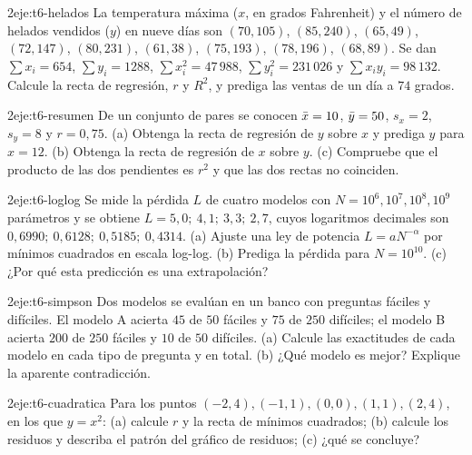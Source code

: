 \begin{ejercicio}{2}{eje:t6-helados}
La temperatura máxima ($x$, en grados Fahrenheit) y el número de helados vendidos ($y$) en nueve días son $(70,105)$, $(85,240)$, $(65,49)$, $(72,147)$, $(80,231)$, $(61,38)$, $(75,193)$, $(78,196)$, $(68,89)$. Se dan $\sum x_i=654$, $\sum y_i=1288$, $\sum x_i^{2}=47\,988$, $\sum y_i^{2}=231\,026$ y $\sum x_iy_i=98\,132$. Calcule la recta de regresión, $r$ y $R^{2}$, y prediga las ventas de un día a $74$ grados.
\end{ejercicio}

\begin{ejercicio}{2}{eje:t6-resumen}
De un conjunto de pares se conocen $\bar{x}=10$, $\bar{y}=50$, $s_x=2$, $s_y=8$ y $r=0{,}75$. (a) Obtenga la recta de regresión de $y$ sobre $x$ y prediga $y$ para $x=12$. (b) Obtenga la recta de regresión de $x$ sobre $y$. (c) Compruebe que el producto de las dos pendientes es $r^{2}$ y que las dos rectas no coinciden.
\end{ejercicio}

\begin{ejercicio}{2}{eje:t6-loglog}
Se mide la pérdida $L$ de cuatro modelos con $N=10^{6},10^{7},10^{8},10^{9}$ parámetros y se obtiene $L=5{,}0;\allowbreak\ 4{,}1;\allowbreak\ 3{,}3;\allowbreak\ 2{,}7$, cuyos logaritmos decimales son $0{,}6990;\allowbreak\ 0{,}6128;\allowbreak\ 0{,}5185;\allowbreak\ 0{,}4314$. (a) Ajuste una ley de potencia $L=aN^{-\alpha}$ por mínimos cuadrados en escala log-log. (b) Prediga la pérdida para $N=10^{10}$. (c) ¿Por qué esta predicción es una extrapolación?
\end{ejercicio}

\begin{ejercicio}{2}{eje:t6-simpson}
Dos modelos se evalúan en un banco con preguntas fáciles y difíciles. El modelo A acierta $45$ de $50$ fáciles y $75$ de $250$ difíciles; el modelo B acierta $200$ de $250$ fáciles y $10$ de $50$ difíciles. (a) Calcule las exactitudes de cada modelo en cada tipo de pregunta y en total. (b) ¿Qué modelo es mejor? Explique la aparente contradicción.
\end{ejercicio}

\begin{ejercicio}{2}{eje:t6-cuadratica}
Para los puntos $(-2,4),(-1,1),(0,0),(1,1),(2,4)$, en los que $y=x^{2}$: (a) calcule $r$ y la recta de mínimos cuadrados; (b) calcule los residuos y describa el patrón del gráfico de residuos; (c) ¿qué se concluye?
\end{ejercicio}

